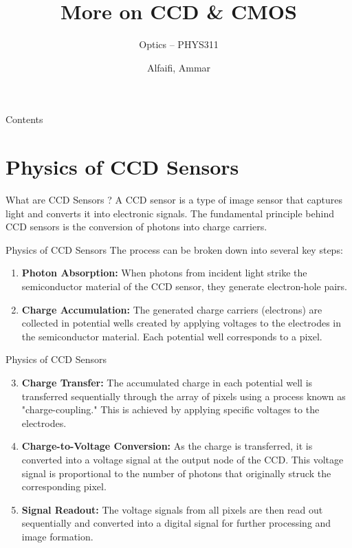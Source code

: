 \documentclass{loyola-beamer}
\title{More on CCD \& CMOS}
\subtitle{Optics -- PHYS311}
\author{Alfaifi, Ammar}
\institute{KFUPM}
\begin{document}
\begin{titleframe}{}
	\maketitle
\end{titleframe}

\begin{frame}{Contents}
	\tableofcontents
\end{frame}


\section{Physics of CCD Sensors}

\begin{titleframe}{What are CCD Sensors ?}
	A CCD sensor is a type of image sensor that captures light and converts it into electronic signals. The fundamental principle behind CCD sensors is the conversion of photons into charge carriers.
\end{titleframe}

\begin{frame}{Physics of CCD Sensors}
	The process can be broken down into several key steps:
	\vspace{\baselineskip}

	\begin{enumerate}
		\item \textbf{Photon Absorption:} When photons from incident light strike the semiconductor material of the CCD sensor, they generate electron-hole pairs.

		\item \textbf{Charge Accumulation:} The generated charge carriers (electrons) are collected in potential wells created by applying voltages to the electrodes in the semiconductor material. Each potential well corresponds to a pixel.
	\end{enumerate}
\end{frame}

\begin{frame}{Physics of CCD Sensors}
	\begin{enumerate}
		\setcounter{enumi}{2}
		\item \textbf{Charge Transfer:} The accumulated charge in each potential well is transferred sequentially through the array of pixels using a process known as "charge-coupling." This is achieved by applying specific voltages to the electrodes.

		\item \textbf{Charge-to-Voltage Conversion:} As the charge is transferred, it is converted into a voltage signal at the output node of the CCD. This voltage signal is proportional to the number of photons that originally struck the corresponding pixel.

		\item \textbf{Signal Readout:} The voltage signals from all pixels are then read out sequentially and converted into a digital signal for further processing and image formation.
	\end{enumerate}
\end{frame}
\end{document}
